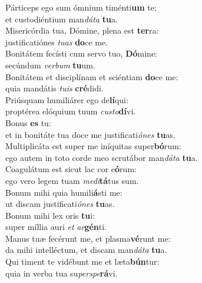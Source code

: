 \oddverse Párticeps ego sum ómnium timénti\textbf{um} te:~\*\\
\oddverse et custodiéntium man\textit{dá}\textit{ta} \textbf{tu}a.\\
\evenverse Misericórdia tua, Dómine, plena est \textbf{ter}ra:~\*\\
\evenverse justificatiónes \textit{tu}\textit{as} \textbf{do}ce me.\\
\oddverse Bonitátem fecísti cum servo tuo, \textbf{Dó}mine:~\*\\
\oddverse secúndum \textit{ver}\textit{bum} \textbf{tu}um.\\
\evenverse Bonitátem et disciplínam et sciéntiam \textbf{do}ce me:~\*\\
\evenverse quia mandátis \textit{tu}\textit{is} \textbf{cré}didi.\\
\oddverse Priúsquam humiliárer ego de\textbf{lí}qui:~\*\\
\oddverse proptérea elóquium tuum \textit{cu}\textit{sto}\textbf{dí}vi.\\
\evenverse Bonus \textbf{es} tu:~\*\\
\evenverse et in bonitáte tua doce me justificati\textit{ó}\textit{nes} \textbf{tu}as.\\
\oddverse Multiplicáta est super me iníquitas super\textbf{bó}rum:~\*\\
\oddverse ego autem in toto corde meo scrutábor man\textit{dá}\textit{ta} \textbf{tu}a.\\
\evenverse Coagulátum est sicut lac cor e\textbf{ó}rum:~\*\\
\evenverse ego vero legem tuam \textit{me}\textit{di}\textbf{tá}tus sum.\\
\oddverse Bonum mihi quia humili\textbf{á}sti me:~\*\\
\oddverse ut discam justificati\textit{ó}\textit{nes} \textbf{tu}as.\\
\evenverse Bonum mihi lex oris \textbf{tu}i:~\*\\
\evenverse super míllia auri \textit{et} \textit{ar}\textbf{gén}ti.\\
\oddverse Manus tuæ fecérunt me, et plasma\textbf{vé}runt me:~\*\\
\oddverse da mihi intelléctum, et discam man\textit{dá}\textit{ta} \textbf{tu}a.\\
\evenverse Qui timent te vidébunt me et læta\textbf{bún}tur:~\*\\
\evenverse quia in verba tua su\textit{per}\textit{spe}\textbf{rá}vi.\\
